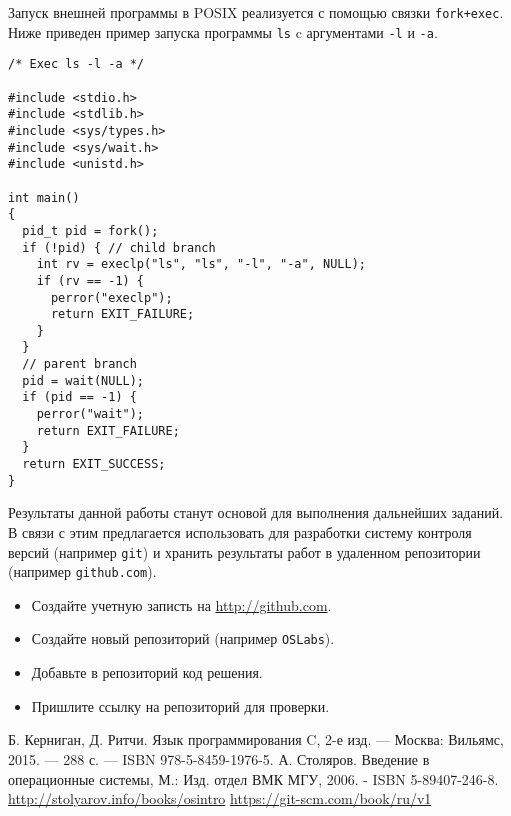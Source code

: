 \documentclass{extarticle}
\begin{document}
Запуск внешней программы в POSIX реализуется с помощью связки {\tt fork+exec}.
Ниже приведен пример запуска программы {\tt ls} c аргументами {\tt -l} и {\tt -a}.
\begin{verbatim}
/* Exec ls -l -a */

#include <stdio.h>
#include <stdlib.h>
#include <sys/types.h>
#include <sys/wait.h>
#include <unistd.h>

int main()
{
  pid_t pid = fork();
  if (!pid) { // child branch
    int rv = execlp("ls", "ls", "-l", "-a", NULL);
    if (rv == -1) {
      perror("execlp");
      return EXIT_FAILURE;
    }
  }
  // parent branch
  pid = wait(NULL);
  if (pid == -1) {
    perror("wait");
    return EXIT_FAILURE;
  }
  return EXIT_SUCCESS;
}
\end{verbatim}

Результаты данной работы станут основой для выполнения дальнейших заданий.
В связи с этим предлагается использовать для разработки систему контроля версий (например {\tt git}\cite{GitCookbook}) и хранить результаты работ в удаленном репозитории (например {\tt github.com}).

\begin{itemize}
    \item Создайте учетную записть на \url{http://github.com}.
    \item Создайте новый репозиторий (например {\tt OSLabs}).
    \item Добавьте в репозиторий код решения.
    \item Пришлите ссылку на репозиторий для проверки.
\end{itemize}

\begin{thebibliography}{9}
     Б. Керниган, Д. Ритчи. Язык программирования C, 2-е изд. — Москва: Вильямс, 2015. — 288 с. — ISBN 978-5-8459-1976-5.
     А. Столяров. Введение в операционные системы, М.: Изд. отдел ВМК МГУ, 2006. - ISBN 5-89407-246-8. \url{http://stolyarov.info/books/osintro}
     \url{https://git-scm.com/book/ru/v1}
\end{thebibliography}
\end{document}

